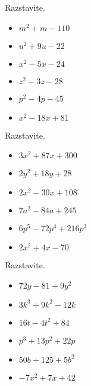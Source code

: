     
        
            \begin{naloga}
                Razstavite.
                \begin{itemize}
                    \item $m^2+m-110$ 
                    \item $u^2+9u-22$ 
                    \item $x^2-5x-24$ 
                    \item $z^2-3z-28$ 
                    \item $p^2-4p-45$ 
                    \item $x^2-18x+81$ 
                \end{itemize}
            \end{naloga}
        
    
        
            \begin{naloga}
                Razstavite.
                \begin{itemize}
                    \item $3x^2+87x+300$ 
                    \item $2y^2+18y+28$ 
                    \item $2x^2-30x+108$ 
                    \item $7a^2-84a+245$ 
                    \item $6p^5-72p^4+216p^3$ 
                    \item $2x^2+4x-70$ 
                \end{itemize}
            \end{naloga}
        
    
        
            \begin{naloga}
                Razstavite.
                \begin{itemize}
                    \item $72y-81+9y^2$ 
                    \item $3k^3+9k^2-12k$ 
                    \item $16t-4t^2+84$ 
                    \item $p^3+13p^2+22p$ 
                    \item $50b+125+5b^2$ 
                    \item $-7x^2+7x+42$ 
                \end{itemize}
            \end{naloga}
        
